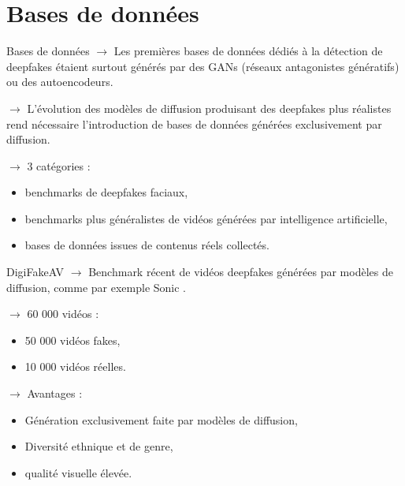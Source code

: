 \documentclass[10pt,aspectratio=169]{beamer}
\begin{document}

\section{Bases de données}
\begin{frame}{Bases de données}
    $\to$ Les premières bases de données dédiés à la détection de deepfakes étaient surtout générés par des GANs (réseaux antagonistes génératifs) ou des autoencodeurs.

    \bigskip

    $\to$ L'évolution des modèles de diffusion produisant des deepfakes plus réalistes rend nécessaire l'introduction de bases de données générées exclusivement par diffusion.

    \bigskip 
    
    $\to$ 3 catégories : 
    \begin{itemize}
        \item benchmarks de deepfakes faciaux,
        \item benchmarks plus généralistes de vidéos générées par intelligence artificielle,
        \item bases de données issues de contenus réels collectés.
    \end{itemize}
\end{frame}

\begin{frame}{DigiFakeAV \citep{liu}}
    $\to$ Benchmark récent de vidéos deepfakes générées par modèles de diffusion, comme par exemple Sonic \citep{ji}.

    \bigskip

    $\to$ 60 000 vidéos : 
    \begin{itemize}
        \item 50 000 vidéos fakes,
        \item 10 000 vidéos réelles.
    \end{itemize}

    \bigskip 

    $\to$ Avantages : 
    \begin{itemize}
        \item Génération exclusivement faite par modèles de diffusion,
        \item Diversité ethnique et de genre,
        \item qualité visuelle élevée.
    \end{itemize}
\end{frame}
\end{document}
